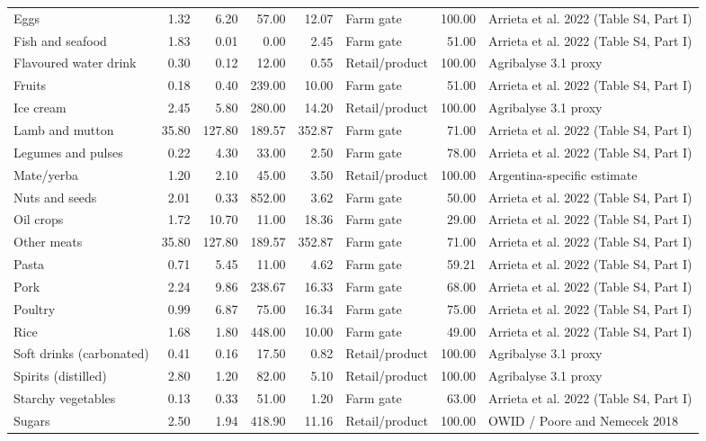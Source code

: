 {\begin{longtable}{p{2.5cm}rrrrp{1.5cm}rp{3.4cm}}
Eggs & 1.32 & 6.20 & 57.00 & 12.07 & Farm gate & 100.00 & Arrieta et al. 2022 (Table S4, Part I)\\
Fish and seafood & 1.83 & 0.01 & 0.00 & 2.45 & Farm gate & 51.00 & Arrieta et al. 2022 (Table S4, Part I)\\
Flavoured water drink & 0.30 & 0.12 & 12.00 & 0.55 & Retail/product & 100.00 & Agribalyse 3.1 proxy\\
Fruits & 0.18 & 0.40 & 239.00 & 10.00 & Farm gate & 51.00 & Arrieta et al. 2022 (Table S4, Part I)\\
Ice cream & 2.45 & 5.80 & 280.00 & 14.20 & Retail/product & 100.00 & Agribalyse 3.1 proxy\\
Lamb and mutton & 35.80 & 127.80 & 189.57 & 352.87 & Farm gate & 71.00 & Arrieta et al. 2022 (Table S4, Part I)\\
Legumes and pulses & 0.22 & 4.30 & 33.00 & 2.50 & Farm gate & 78.00 & Arrieta et al. 2022 (Table S4, Part I)\\
Mate/yerba & 1.20 & 2.10 & 45.00 & 3.50 & Retail/product & 100.00 & Argentina-specific estimate\\
Nuts and seeds & 2.01 & 0.33 & 852.00 & 3.62 & Farm gate & 50.00 & Arrieta et al. 2022 (Table S4, Part I)\\
Oil crops & 1.72 & 10.70 & 11.00 & 18.36 & Farm gate & 29.00 & Arrieta et al. 2022 (Table S4, Part I)\\
Other meats & 35.80 & 127.80 & 189.57 & 352.87 & Farm gate & 71.00 & Arrieta et al. 2022 (Table S4, Part I)\\
Pasta & 0.71 & 5.45 & 11.00 & 4.62 & Farm gate & 59.21 & Arrieta et al. 2022 (Table S4, Part I)\\
Pork & 2.24 & 9.86 & 238.67 & 16.33 & Farm gate & 68.00 & Arrieta et al. 2022 (Table S4, Part I)\\
Poultry & 0.99 & 6.87 & 75.00 & 16.34 & Farm gate & 75.00 & Arrieta et al. 2022 (Table S4, Part I)\\
Rice & 1.68 & 1.80 & 448.00 & 10.00 & Farm gate & 49.00 & Arrieta et al. 2022 (Table S4, Part I)\\
Soft drinks (carbonated) & 0.41 & 0.16 & 17.50 & 0.82 & Retail/product & 100.00 & Agribalyse 3.1 proxy\\
Spirits (distilled) & 2.80 & 1.20 & 82.00 & 5.10 & Retail/product & 100.00 & Agribalyse 3.1 proxy\\
Starchy vegetables & 0.13 & 0.33 & 51.00 & 1.20 & Farm gate & 63.00 & Arrieta et al. 2022 (Table S4, Part I)\\
Sugars & 2.50 & 1.94 & 418.90 & 11.16 & Retail/product & 100.00 & OWID / Poore and Nemecek 2018\\

\end{longtable}}
